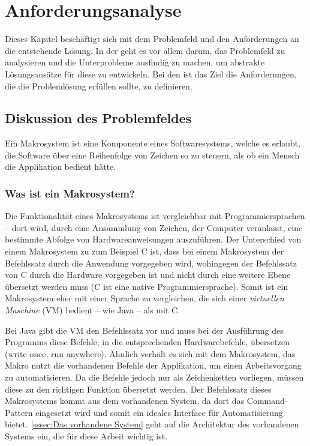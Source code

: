 \section{An\-for\-de\-rungs\-ana\-ly\-se}
\label{sec:Anforderungsanalyse}
  Dieses Kapitel beschäftigt sich mit dem Problemfeld und den Anforderungen an die entstehende Lösung. In der  geht es vor allem darum, das Problemfeld zu analysieren und die Unterprobleme ausfindig zu machen, um abstrakte Lösungsansätze für diese zu entwickeln. Bei den  ist das Ziel die Anforderungen, die die Problemlösung erfüllen sollte, zu definieren.

  \subsection{Diskussion des Problemfeldes}
  \label{ssec:Diskussion des Problemfeldes}
    Ein Makrosystem ist eine Komponente eines Softwaresystems, welche es erlaubt, die Software über eine Reihenfolge von Zeichen so zu steuern, als ob ein Mensch die Applikation bedient hätte.

    \subsubsection{Was ist ein Makrosystem?}
    \label{sssec:Was ist ein Makrosystem?}
      Die Funktionalität eines Makrosystems ist vergleichbar mit Programmiersprachen -- dort wird, durch eine Ansammlung von Zeichen, der Computer veranlasst, eine bestimmte Abfolge von Hardwareanweisungen auszuführen. Der Unterschied von einem Makrosystem zu zum Beispiel C ist, dass bei einem Makrosystem der Befehlssatz durch die Anwendung vorgegeben wird, wohingegen der Befehlssatz von C durch die Hardware vorgegeben ist und nicht durch eine weitere Ebene übersetzt werden muss (C ist eine native Programmiersprache). Somit ist ein Makrosystem eher mit einer Sprache zu vergleichen, die sich einer \emph{virtuellen Maschine} (VM) bedient -- wie Java -- als mit C.

      Bei Java gibt die VM den Befehlssatz vor und muss bei der Ausführung des Programms diese Befehle, in die entsprechenden Hardwarebefehle, übersetzen (write once, run anywhere). Ähnlich verhält es sich mit dem Makrosystem, das Makro nutzt die vorhandenen Befehle der Applikation, um einen Arbeitsvorgang zu automatisieren. Da die Befehle jedoch nur als Zeichenketten vorliegen, müssen diese zu den richtigen Funktion übersetzt werden. Der Befehlssatz dieses Makrosystems kommt aus dem vorhandenen System, da dort das Command-Pattern \autocite[S.263]{Gamma:1995:DPE:186897} eingesetzt wird und somit ein ideales Interface für Automatisierung bietet. \autoref{sssec:Das vorhandene System} geht auf die Architektur des vorhandenen Systems ein, die für diese Arbeit wichtig ist.

